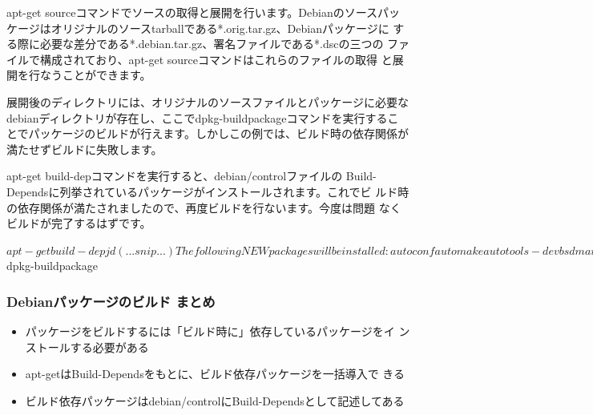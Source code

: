 \documentclass[mingoth,a4paper]{jsarticle}
\begin{document}
apt-get sourceコマンドでソースの取得と展開を行います。Debianのソースパッ
ケージはオリジナルのソースtarballである*.orig.tar.gz、Debianパッケージに
する際に必要な差分である*.debian.tar.gz、署名ファイルである*.dscの三つの
ファイルで構成されており、apt-get sourceコマンドはこれらのファイルの取得
と展開を行なうことができます。

展開後のディレクトリには、オリジナルのソースファイルとパッケージに必要な
debianディレクトリが存在し、ここでdpkg-buildpackageコマンドを実行するこ
とでパッケージのビルドが行えます。しかしこの例では、ビルド時の依存関係が
満たせずビルドに失敗します。


apt-get build-depコマンドを実行すると、debian/controlファイルの
Build-Dependsに列挙されているパッケージがインストールされます。これでビ
ルド時の依存関係が満たされましたので、再度ビルドを行ないます。今度は問題
なくビルドが完了するはずです。

\begin{commandline}
$ apt-get build-dep jd
   (...snip...)
The following NEW packages will be installed:
  autoconf automake autotools-dev bsdmainutils debhelper defoma diffstat file
  fontconfig fontconfig-config gettext gettext-base groff-base
  hardening-wrapper html2text intltool-debian libasound2 libasound2-dev
   (...snip...)
$ dpkg-buildpackage
\end{commandline}

\subsubsection{Debianパッケージのビルド まとめ}

\begin{itemize}
 \item パッケージをビルドするには「ビルド時に」依存しているパッケージをイ
       ンストールする必要がある

 \item apt-getはBuild-Dependsをもとに、ビルド依存パッケージを一括導入で
       きる

 \item ビルド依存パッケージはdebian/controlにBuild-Dependsとして記述してある

\end{itemize}
\end{document}
